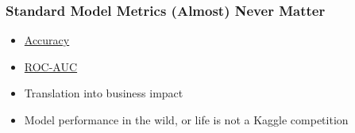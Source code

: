 \begin{frame}
\frametitle{Standard Model Metrics (Almost) Never Matter}

\begin{itemize}
    \item \href{https://scikit-learn.org/stable/modules/generated/sklearn.metrics.accuracy\_score.html}{Accuracy} \cite{aletras2016predicting, echr-2}
    \item \href{https://scikit-learn.org/stable/modules/generated/sklearn.metrics.roc\_auc\_score.html\#sklearn.metrics.roc\_auc\_score}{ROC-AUC}
    \item Translation into business impact
    \item Model performance in the wild, or life is not a Kaggle competition\newline
\end{itemize}


\end{frame}
